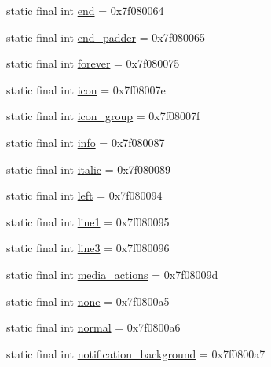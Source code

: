 \begin{DoxyCompactItemize}
\item 
static final int \mbox{\hyperlink{classandroid_1_1support_1_1v4_1_1_r_1_1id_ab07961478cba8046460b156bfe29c5e4}{end}} = 0x7f080064
\item 
static final int \mbox{\hyperlink{classandroid_1_1support_1_1v4_1_1_r_1_1id_a8e2de59a9001feb70cbf25a63296a6c4}{end\+\_\+padder}} = 0x7f080065
\item 
static final int \mbox{\hyperlink{classandroid_1_1support_1_1v4_1_1_r_1_1id_a5883771ab7e95823c127b5d3013e0dfe}{forever}} = 0x7f080075
\item 
static final int \mbox{\hyperlink{classandroid_1_1support_1_1v4_1_1_r_1_1id_a62604496896d5069c3673d6ff13b2dee}{icon}} = 0x7f08007e
\item 
static final int \mbox{\hyperlink{classandroid_1_1support_1_1v4_1_1_r_1_1id_a540e31dc0dde6271ea50f4f8d1b86cd5}{icon\+\_\+group}} = 0x7f08007f
\item 
static final int \mbox{\hyperlink{classandroid_1_1support_1_1v4_1_1_r_1_1id_af9b4f5497aef6dd0520bfb1b3d5dd026}{info}} = 0x7f080087
\item 
static final int \mbox{\hyperlink{classandroid_1_1support_1_1v4_1_1_r_1_1id_a9996d770f69100664e988763ccf14804}{italic}} = 0x7f080089
\item 
static final int \mbox{\hyperlink{classandroid_1_1support_1_1v4_1_1_r_1_1id_a8e61961887a658253c7357282f98ccba}{left}} = 0x7f080094
\item 
static final int \mbox{\hyperlink{classandroid_1_1support_1_1v4_1_1_r_1_1id_ae38dbdf66d5cc40958bc723bfdeaea89}{line1}} = 0x7f080095
\item 
static final int \mbox{\hyperlink{classandroid_1_1support_1_1v4_1_1_r_1_1id_a0bd6ed4a92b821d9a3dcac27abc038b0}{line3}} = 0x7f080096
\item 
static final int \mbox{\hyperlink{classandroid_1_1support_1_1v4_1_1_r_1_1id_a5002529f1c643c3d506c47c6089bbcf5}{media\+\_\+actions}} = 0x7f08009d
\item 
static final int \mbox{\hyperlink{classandroid_1_1support_1_1v4_1_1_r_1_1id_a2a3d35eb1901faba87923c10e16daed0}{none}} = 0x7f0800a5
\item 
static final int \mbox{\hyperlink{classandroid_1_1support_1_1v4_1_1_r_1_1id_a08f13192f229edf6b2cb55f11f679a8e}{normal}} = 0x7f0800a6
\item 
static final int \mbox{\hyperlink{classandroid_1_1support_1_1v4_1_1_r_1_1id_aefd50ba86a9a1bed7ca654118a389ec1}{notification\+\_\+background}} = 0x7f0800a7
\item 

\end{DoxyCompactItemize}
